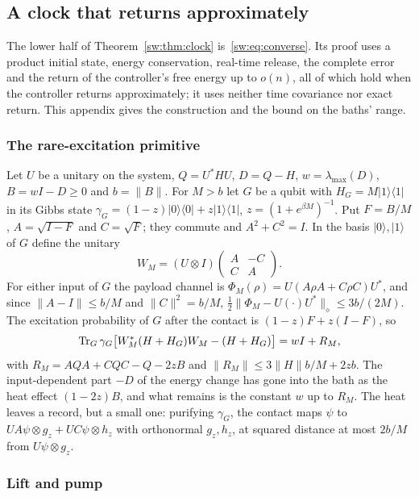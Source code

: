 \subsection{A clock that returns approximately}\label{sw:app:clock}

The lower half of Theorem~\ref{sw:thm:clock} is~\eqref{sw:eq:converse}. Its proof uses a product initial state, energy conservation, real-time release, the complete error and the return of the controller's free energy up to $o(n)$, all of which hold when the controller returns approximately; it uses neither time covariance nor exact return. This appendix gives the construction and the bound on the baths' range.

\subsubsection{The rare-excitation primitive}

Let $U$ be a unitary on the system, $Q=U^*HU$, $D=Q-H$, $w=\lambda_{\max}(D)$, $B=wI-D\ge0$ and $b=\|B\|$. For $M>b$ let $G$ be a qubit with $H_G=M|1\rangle\langle1|$ in its Gibbs state $\gamma_G=(1-z)|0\rangle\langle0|+z|1\rangle\langle1|$, $z=(1+e^{\beta M})^{-1}$. Put $F=B/M$, $A=\sqrt{I-F}$ and $C=\sqrt F$; they commute and $A^2+C^2=I$. In the basis $|0\rangle,|1\rangle$ of $G$ define the unitary
\[
W_M=(U\otimes I)\begin{pmatrix}A&-C\\C&A\end{pmatrix}.
\]
For either input of $G$ the payload channel is $\Phi_M(\rho)=U(A\rho A+C\rho C)U^*$, and since $\|A-I\|\le b/M$ and $\|C\|^2=b/M$, $\frac12\|\Phi_M-U(\cdot)U^*\|_\diamond\le3b/(2M)$. The excitation probability of $G$ after the contact is $(1-z)F+z(I-F)$, so
\[
\operatorname{Tr}_G\gamma_G\bigl[W_M^*(H+H_G)W_M-(H+H_G)\bigr]=wI+R_M,
\]
with $R_M=AQA+CQC-Q-2zB$ and $\|R_M\|\le3\|H\|b/M+2zb$.
The input-dependent part $-D$ of the energy change has gone into the bath as the heat effect $(1-2z)B$, and what remains is the constant $w$ up to $R_M$. The heat leaves a record, but a small one: purifying $\gamma_G$, the contact maps $\psi$ to $UA\psi\otimes g_z+UC\psi\otimes h_z$ with orthonormal $g_z,h_z$, at squared distance at most $2b/M$ from $U\psi\otimes g_z$.

\subsubsection{Lift and pump}

